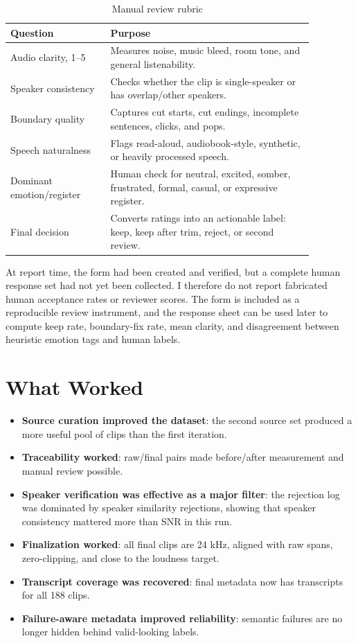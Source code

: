 \documentclass[11pt]{article}
\begin{document}
\begin{table}[H]
\centering
\caption{Manual review rubric}
\begin{tabular}{p{0.29\linewidth}p{0.58\linewidth}}
\toprule
\textbf{Question} & \textbf{Purpose} \\
\midrule
Audio clarity, 1--5 & Measures noise, music bleed, room tone, and general listenability. \\
Speaker consistency & Checks whether the clip is single-speaker or has overlap/other speakers. \\
Boundary quality & Captures cut starts, cut endings, incomplete sentences, clicks, and pops. \\
Speech naturalness & Flags read-aloud, audiobook-style, synthetic, or heavily processed speech. \\
Dominant emotion/register & Human check for neutral, excited, somber, frustrated, formal, casual, or expressive register. \\
Final decision & Converts ratings into an actionable label: keep, keep after trim, reject, or second review. \\
\bottomrule
\end{tabular}
\end{table}

At report time, the form had been created and verified, but a complete human response set had not yet been collected. I therefore do not report fabricated human acceptance rates or reviewer scores. The form is included as a reproducible review instrument, and the response sheet can be used later to compute keep rate, boundary-fix rate, mean clarity, and disagreement between heuristic emotion tags and human labels.

\section{What Worked}

\begin{itemize}
    \item \textbf{Source curation improved the dataset}: the second source set produced a more useful pool of clips than the first iteration.
    \item \textbf{Traceability worked}: raw/final pairs made before/after measurement and manual review possible.
    \item \textbf{Speaker verification was effective as a major filter}: the rejection log was dominated by speaker similarity rejections, showing that speaker consistency mattered more than SNR in this run.
    \item \textbf{Finalization worked}: all final clips are 24 kHz, aligned with raw spans, zero-clipping, and close to the loudness target.
    \item \textbf{Transcript coverage was recovered}: final metadata now has transcripts for all 188 clips.
    \item \textbf{Failure-aware metadata improved reliability}: semantic failures are no longer hidden behind valid-looking labels.
\end{itemize}
\end{document}
